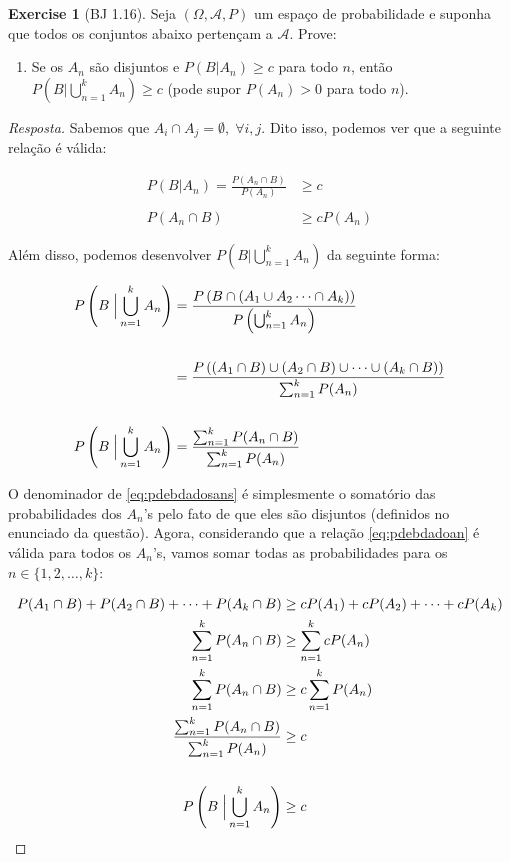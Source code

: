 \documentclass[
]{article}
\providecommand{\tightlist}{%
  \setlength{\itemsep}{0pt}\setlength{\parskip}{0pt}}
\theoremstyle{definition}
\theoremstyle{definition}
\theoremstyle{definition}
\newtheorem{exercise}{Exercise}[section]
\theoremstyle{definition}
\theoremstyle{remark}
\begin{document}
\begin{exercise}[BJ 1.16]

Seja \((\Omega, \mathcal{A},P)\) um espaço de probabilidade e suponha que todos os conjuntos abaixo pertençam a \(\mathcal{A}\). Prove:

\begin{enumerate}
\def\labelenumi{\alph{enumi})}
\tightlist
\item
  Se os \(A_{n}\) são disjuntos e \(P(B|A_{n}) \ge c\) para todo \(n\), então \(P(B|\bigcup_{n=1}^{k}A_{n}) \ge c\) (pode supor \(P(A_{n}) > 0\) para todo \(n\)).
\end{enumerate}

\begin{proof}[Resposta]
Sabemos que \(A_{i} \cap A_{j} = \emptyset, \; \forall i,j\). Dito isso, podemos ver que a seguinte relação é válida:

\begin{align}
P(B|A_{n}) = \frac{P(A_{n} \cap B)}{P(A_{n})} &\ge c \nonumber \\ \nonumber \\
P(A_{n} \cap B) &\ge cP(A_{n})
\label{eq:pdebdadoan}
\end{align}

Além disso, podemos desenvolver \(P(B|\bigcup_{n=1}^{k}A_{n})\) da seguinte forma:

\begin{align}
P\left(B \; \Big{|} \bigcup_{n=1}^{k}A_{n}\right) &= \frac{P\left(B \cap (A_{1} \cup A_{2} \dots \cap A_{k})\right)}{P\left(\bigcup_{n=1}^{k}A_{n}\right)} \nonumber \\ \nonumber \\
&= \frac{P\left((A_{1} \cap B) \cup (A_{2} \cap B) \cup \dots \cup (A_{k} \cap B)\right)}{\sum_{n = 1}^{k}P(A_{n})} \nonumber \\ \nonumber \\
P\left(B \; \Big{|} \bigcup_{n=1}^{k}A_{n}\right) &= \frac{\sum_{n=1}^{k}P(A_{n} \cap B)}{\sum_{n = 1}^{k}P(A_{n})}
\label{eq:pdebdadosans}
\end{align}

O denominador de \eqref{eq:pdebdadosans} é simplesmente o somatório das probabilidades dos \(A_{n}\)'s pelo fato de que eles são disjuntos (definidos no enunciado da questão). Agora, considerando que a relação \eqref{eq:pdebdadoan} é válida para todos os \(A_{n}\)'s, vamos somar todas as probabilidades para os \(n \in \{1,2,\dots,k\}\):

\begin{align*}
P(A_{1} \cap B) + P(A_{2} \cap B) + \dots + P(A_{k} \cap B) &\ge cP(A_{1}) + cP(A_{2}) + \dots + cP(A_{k}) \\
\sum_{n=1}^{k}P(A_{n} \cap B) &\ge \sum_{n=1}^{k}cP(A_{n}) \\
\sum_{n=1}^{k}P(A_{n} \cap B) &\ge c\sum_{n=1}^{k}P(A_{n}) \\
\frac{\sum_{n=1}^{k}P(A_{n} \cap B)}{\sum_{n=1}^{k}P(A_{n})} &\ge c \\ \\
P\left(B \; \Big{|} \bigcup_{n=1}^{k}A_{n}\right) &\ge c
\end{align*}
\end{proof}


\end{exercise}
\end{document}
